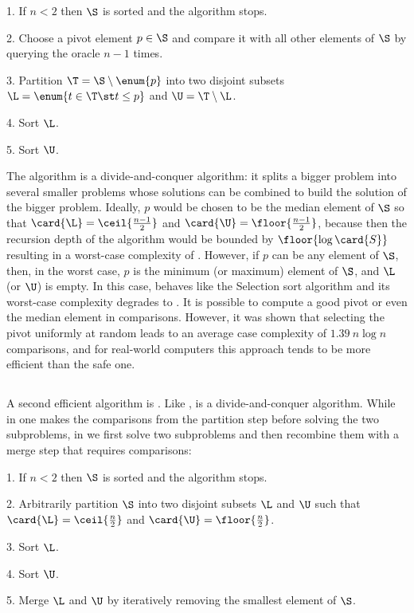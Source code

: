 \begin{algorithm}[\quicksort]
\item[1.] If \(n < 2\) then \(\S\) is sorted and the algorithm stops.
\item[2.] Choose a pivot element \(p \in \S\) and compare it with all other
elements of \(\S\) by querying the oracle \(n - 1\) times.
\item[3.] Partition \(\T = \S \setminus \enum{p}\) into two disjoint subsets
\(\L = \enum{t \in \T \st t \le p}\) and \(\U = \T \setminus \L\).
\item[4.] Sort \(\L\).
\item[5.] Sort \(\U\).
\end{algorithm}

The \quicksort algorithm is a divide-and-conquer algorithm: it splits a bigger
problem into several smaller problems whose solutions can be combined to build
the solution of the bigger problem. Ideally, \(p\) would be chosen to be the
median element of \(\S\) so that \(\card{\L} = \ceil{\frac{n-1}{2}}\) and
\(\card{\U} = \floor{\frac{n-1}{2}}\), because then the recursion depth of the
algorithm would be bounded by \(\floor{\log \card{S}}\) resulting in a
worst-case complexity of . However, if \(p\) can be any element
of \(\S\), then, in the worst case, \(p\) is the minimum (or maximum) element of
\(\S\), and \(\L\) (or \(\U\)) is empty. In this case, \quicksort behaves like
the Selection sort algorithm and its worst-case complexity degrades to
. It is possible \cite{blum:1973} to compute a good pivot or even the
median element in  comparisons. However, it was shown \cite{hoare:1962}
that selecting the pivot uniformly at random leads to an average case
complexity of \(1.39~n \log n\) comparisons, and for real-world computers this
approach tends to be more efficient than the safe one.

\subsection{\mergesort}
A second efficient algorithm is \mergesort
\cite{goldstine:1948,leiserson:2001}. Like \quicksort, \mergesort is a
divide-and-conquer algorithm. While in \quicksort one makes the comparisons from
the partition step before solving the two subproblems, in \mergesort we
first solve two subproblems and then recombine them with a merge step that
requires  comparisons:

\begin{algorithm}[\mergesort]
\item[1.] If \(n < 2\) then \(\S\) is sorted and the algorithm stops.
\item[2.] Arbitrarily partition \(\S\) into two disjoint subsets \(\L\) and
\(\U\) such that \(\card{\L} = \ceil{\frac{n}{2}}\) and \(\card{\U} =
\floor{\frac{n}{2}}\).
\item[3.] Sort \(\L\).
\item[4.] Sort \(\U\).
\item[5.] Merge \(\L\) and \(\U\) by iteratively removing the smallest element
of \(\S\).
\end{algorithm}

